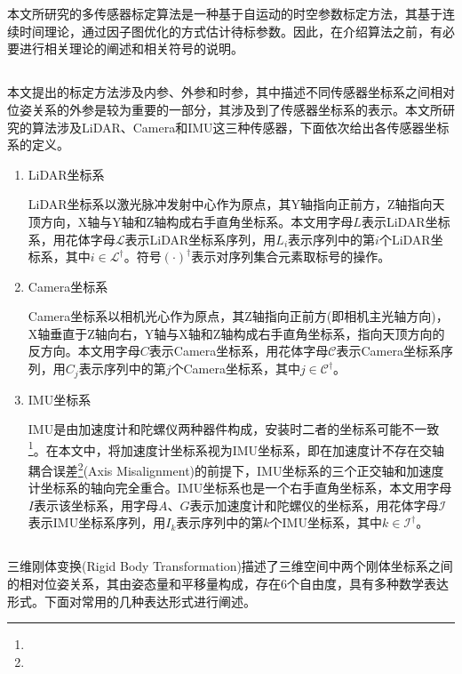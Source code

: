 
\chapter{}
本文所研究的多传感器标定算法是一种基于自运动的时空参数标定方法，其基于连续时间理论，通过因子图优化的方式估计待标参数。因此，在介绍算法之前，有必要进行相关理论的阐述和相关符号的说明。

\section{}
本文提出的标定方法涉及内参、外参和时参，其中描述不同传感器坐标系之间相对位姿关系的外参是较为重要的一部分，其涉及到了传感器坐标系的表示。本文所研究的算法涉及LiDAR、Camera和IMU这三种传感器，下面依次给出各传感器坐标系的定义。
\begin{enumerate}
  \item LiDAR坐标系

        LiDAR坐标系以激光脉冲发射中心作为原点，其Y轴指向正前方，Z轴指向天顶方向，X轴与Y轴和Z轴构成右手直角坐标系。本文用字母$L$表示LiDAR坐标系，用花体字母$\mathcal{L}$表示LiDAR坐标系序列，用$L_i$表示序列中的第$i$个LiDAR坐标系，其中$i\in\mathcal{L}^\dagger$。符号$(\cdot)^\dagger$表示对序列集合元素取标号的操作。
  \item Camera坐标系

        Camera坐标系以相机光心作为原点，其Z轴指向正前方(即相机主光轴方向)，X轴垂直于Z轴向右，Y轴与X轴和Z轴构成右手直角坐标系，指向天顶方向的反方向。本文用字母$C$表示Camera坐标系，用花体字母$\mathcal{C}$表示Camera坐标系序列，用$C_j$表示序列中的第$j$个Camera坐标系，其中$j\in\mathcal{C}^\dagger$。
  \item IMU坐标系

        IMU是由加速度计和陀螺仪两种器件构成，安装时二者的坐标系可能不一致\footnote{}。在本文中，将加速度计坐标系视为IMU坐标系，即在加速度计不存在交轴耦合误差\footnote{}(Axis Misalignment)的前提下，IMU坐标系的三个正交轴和加速度计坐标系的轴向完全重合。IMU坐标系也是一个右手直角坐标系，本文用字母$I$表示该坐标系，用字母$A$、$G$表示加速度计和陀螺仪的坐标系，用花体字母$\mathcal{I}$表示IMU坐标系序列，用$I_k$表示序列中的第$k$个IMU坐标系，其中$k\in\mathcal{I}^\dagger$。
\end{enumerate}
\section{}
三维刚体变换(Rigid Body Transformation)描述了三维空间中两个刚体坐标系之间的相对位姿关系，其由姿态量和平移量构成，存在6个自由度，具有多种数学表达形式。下面对常用的几种表达形式进行阐述。
